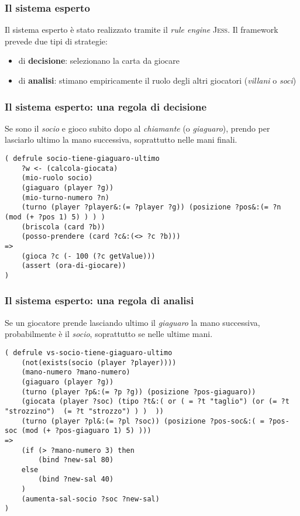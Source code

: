 \documentclass{beamer}
\newcommand*\lista{\item[$\diamondsuit$]}
\begin{document}


\begin{frame}
   \frametitle{Il sistema esperto}
   Il sistema esperto è stato realizzato tramite il \emph{rule engine} \textsc{Jess}.
   \vfill
   \pause
   Il framework prevede due tipi di strategie:
   \begin{itemize}
      \lista di \textbf{decisione}: selezionano la carta da giocare
      \lista di \textbf{analisi}: stimano empiricamente il ruolo degli altri giocatori (\emph{villani} o \emph{soci})
   \end{itemize}
   
   


\end{frame}




\begin{frame}[fragile]
   \frametitle{Il sistema esperto: una regola di decisione}
   Se sono il \emph{socio} e gioco subito dopo al \emph{chiamante} (o \emph{giaguaro}), prendo per lasciarlo ultimo la mano successiva, soprattutto nelle mani finali.
\begin{lstlisting}
( defrule socio-tiene-giaguaro-ultimo
    ?w <- (calcola-giocata)
    (mio-ruolo socio)
    (giaguaro (player ?g))
    (mio-turno-numero ?n)
    (turno (player ?player&:(= ?player ?g)) (posizione ?pos&:(= ?n (mod (+ ?pos 1) 5) ) ) )
    (briscola (card ?b))
    (posso-prendere (card ?c&:(<> ?c ?b)))
=>
    (gioca ?c (- 100 (?c getValue)))
    (assert (ora-di-giocare))
)
\end{lstlisting}
\end{frame}



\begin{frame}[fragile]
   \frametitle{Il sistema esperto: una regola di analisi}
   Se un giocatore prende lasciando ultimo il \emph{giaguaro} la mano successiva, probabilmente è il \emph{socio}, soprattutto se nelle ultime mani.

\begin{lstlisting}
( defrule vs-socio-tiene-giaguaro-ultimo
    (not(exists(socio (player ?player))))
    (mano-numero ?mano-numero)
    (giaguaro (player ?g))
    (turno (player ?p&:(= ?p ?g)) (posizione ?pos-giaguaro))
    (giocata (player ?soc) (tipo ?t&:( or ( = ?t "taglio") (or (= ?t "strozzino")  (= ?t "strozzo") ) )  ))
    (turno (player ?pl&:(= ?pl ?soc)) (posizione ?pos-soc&:( = ?pos-soc (mod (+ ?pos-giaguaro 1) 5) )))
=>
    (if (> ?mano-numero 3) then
        (bind ?new-sal 80)
    else
        (bind ?new-sal 40)
    )
    (aumenta-sal-socio ?soc ?new-sal)
)
\end{lstlisting}
\end{frame}
\end{document}
